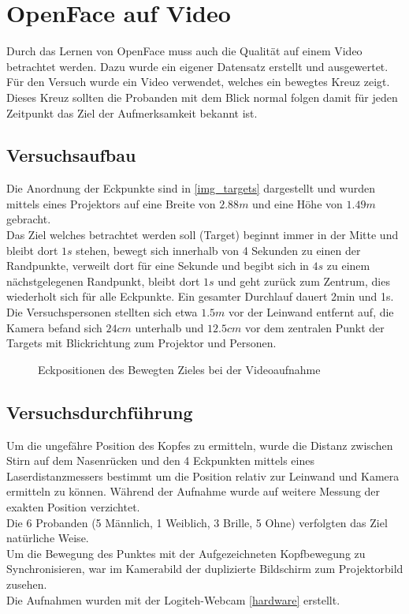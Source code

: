 \section{OpenFace auf Video}
Durch das Lernen von OpenFace muss auch die Qualität auf einem Video betrachtet werden. Dazu wurde ein eigener Datensatz erstellt und ausgewertet.\\
Für den Versuch wurde ein Video verwendet, welches ein bewegtes Kreuz zeigt. Dieses Kreuz sollten die Probanden mit dem Blick normal folgen damit für jeden Zeitpunkt das Ziel der Aufmerksamkeit bekannt ist.
\subsection{Versuchsaufbau}
Die Anordnung der Eckpunkte sind in \autoref{img_targets} dargestellt und wurden mittels eines Projektors auf eine Breite von $2.88m$ und eine Höhe von $1.49m$ gebracht.\\
Das Ziel welches betrachtet werden soll (Target) beginnt immer in der Mitte und bleibt dort $1s$ stehen, bewegt sich innerhalb von 4 Sekunden zu einen der Randpunkte, verweilt dort für eine Sekunde und begibt sich in $4s$ zu einem nächstgelegenen Randpunkt, bleibt dort $1s$ und geht zurück zum Zentrum, dies wiederholt sich für alle Eckpunkte. Ein gesamter Durchlauf dauert 2min und 1s.\\
Die Versuchspersonen stellten sich etwa $1.5m$ vor der Leinwand entfernt auf, die Kamera befand sich $24cm$ unterhalb und $12.5cm$ vor dem zentralen Punkt der Targets mit Blickrichtung zum Projektor und Personen.
\begin{figure}
	\centering
	\caption{Eckpositionen des Bewegten Zieles bei der Videoaufnahme}
	\label{img_targets}
\end{figure}
\subsection{Versuchsdurchführung}
Um die ungefähre Position des Kopfes zu ermitteln, wurde die Distanz zwischen Stirn auf dem Nasenrücken und den 4 Eckpunkten mittels eines Laserdistanzmessers bestimmt um die Position relativ zur Leinwand und Kamera ermitteln zu können. Während der Aufnahme wurde auf weitere Messung der exakten Position verzichtet.\\
Die 6 Probanden (5 Männlich, 1 Weiblich, 3 Brille, 5 Ohne) verfolgten das Ziel natürliche Weise.\\
Um die Bewegung des Punktes mit der Aufgezeichneten Kopfbewegung zu Synchronisieren, war im Kamerabild der duplizierte Bildschirm zum Projektorbild zusehen.\\
Die Aufnahmen wurden mit der Logiteh-Webcam \autoref{hardware} erstellt.
